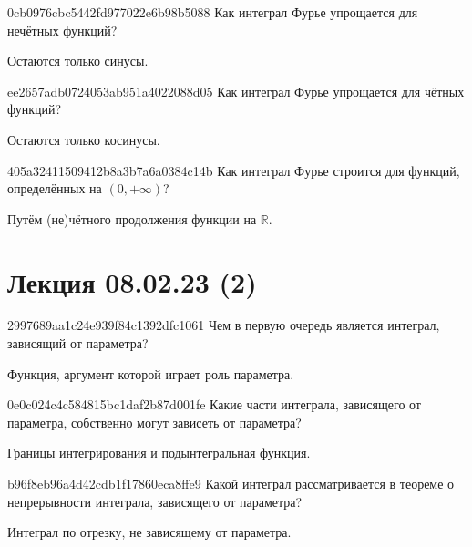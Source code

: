 \begin{note}{0cb0976cbc5442fd977022e6b98b5088}
    Как интеграл Фурье упрощается для нечётных функций?

    \begin{cloze}{1}
        Остаются только синусы.
    \end{cloze}
\end{note}

\begin{note}{ee2657adb0724053ab951a4022088d05}
    Как интеграл Фурье упрощается для чётных функций?

    \begin{cloze}{1}
        Остаются только косинусы.
    \end{cloze}
\end{note}

\begin{note}{405a32411509412b8a3b7a6a0384c14b}
    Как интеграл Фурье строится для функций, определённых на \({ (0, +\infty) }\)?

    \begin{cloze}{1}
        Путём (не)чётного продолжения функции на \({ \mathbb R }\).
    \end{cloze}
\end{note}

\section{Лекция 08.02.23 (2)}
\begin{note}{2997689aa1c24e939f84c1392dfc1061}
    Чем в первую очередь является интеграл, зависящий от параметра?

    \begin{cloze}{1}
        Функция, аргумент которой играет роль параметра.
    \end{cloze}
\end{note}

\begin{note}{0e0c024c4c584815bc1daf2b87d001fe}
    Какие части интеграла, зависящего от параметра, собственно могут зависеть от параметра?

    \begin{cloze}{1}
        Границы интегрирования и подынтегральная функция.
    \end{cloze}
\end{note}

\begin{note}{b96f8eb96a4d42cdb1f17860eca8ffe9}
    Какой интеграл рассматривается в теореме о непрерывности интеграла, зависящего от параметра?

    \begin{cloze}{1}
        Интеграл по отрезку, не зависящему от параметра.
    \end{cloze}
\end{note}


